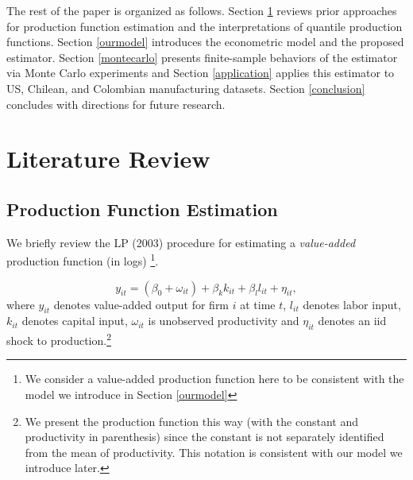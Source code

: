 \documentclass[11pt]{article}
\begin{document}
The rest of the paper is organized as follows. Section \ref{litreview} reviews prior approaches for production function estimation and the interpretations of quantile production functions. Section \ref{ourmodel} introduces the econometric model and the proposed estimator. Section \ref{montecarlo} presents finite-sample behaviors of the estimator via Monte Carlo experiments and Section \ref{application} applies this estimator to US, Chilean, and Colombian manufacturing datasets. Section \ref{conclusion} concludes with directions for future research.

\section{Literature Review} \label{litreview}
\subsection{Production Function Estimation}

We briefly review the LP (2003) procedure for estimating a \textit{value-added} production function (in logs) \footnote{We consider a value-added production function here to be consistent with the model we introduce in Section \ref{ourmodel}}.

\begin{equation}
y_{it}=(\beta_{0}+\omega_{it})+\beta_{k}k_{it}+\beta_{l}l_{it}+\eta_{it},
\end{equation}
where $y_{it}$ denotes value-added output for firm $i$ at time $t$, $l_{it}$ denotes labor input, $k_{it}$ denotes capital input, $\omega_{it}$ is unobserved productivity and $\eta_{it}$ denotes an iid shock to production.\footnote{We present the production function this way (with the constant and productivity in parenthesis) since the constant is not separately identified from the mean of productivity. This notation is consistent with our model we introduce later.}
\end{document}
